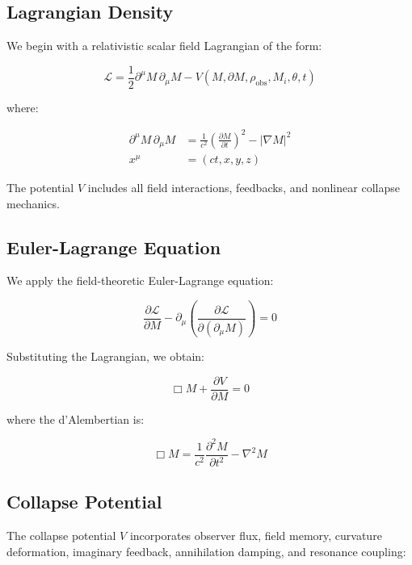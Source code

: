 \subsection{Lagrangian Density}

We begin with a relativistic scalar field Lagrangian of the form:

\begin{equation}
\mathcal{L} = \frac{1}{2} \partial^\mu M \, \partial_\mu M - V(M, \partial M, \rho_{\text{obs}}, M_i, \theta, t)
\end{equation}

where:

\begin{align*}
\partial^\mu M \, \partial_\mu M &= \frac{1}{c^2} \left( \frac{\partial M}{\partial t} \right)^2 - |\nabla M|^2 \\
x^\mu &= (ct, x, y, z)
\end{align*}

The potential \( V \) includes all field interactions, feedbacks, and nonlinear collapse mechanics.

\subsection{Euler-Lagrange Equation}

We apply the field-theoretic Euler-Lagrange equation:

\begin{equation}
\frac{\partial \mathcal{L}}{\partial M} - \partial_\mu \left( \frac{\partial \mathcal{L}}{\partial(\partial_\mu M)} \right) = 0
\end{equation}

Substituting the Lagrangian, we obtain:

\begin{equation}
\Box M + \frac{\partial V}{\partial M} = 0
\end{equation}

where the d'Alembertian is:

\begin{equation}
\Box M = \frac{1}{c^2} \frac{\partial^2 M}{\partial t^2} - \nabla^2 M
\end{equation}

\subsection{Collapse Potential}

The collapse potential \( V \) incorporates observer flux, field memory, curvature deformation, imaginary feedback, annihilation damping, and resonance coupling:

